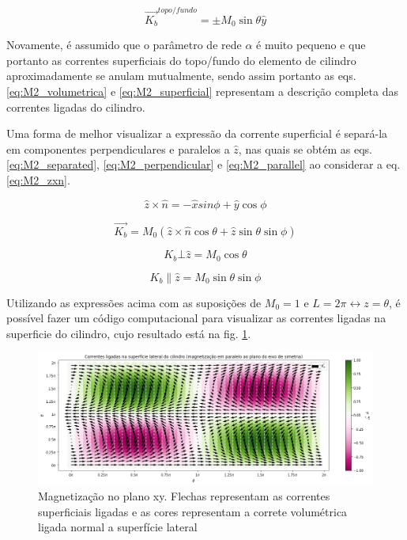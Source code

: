 \documentclass[a4paper, 12pt, twocolumn]{article}
\begin{document}
\begin{equation} \label{eq:M2_superficial_topo}
	\vec{K_b}^{topo/fundo} = \pm M_0 \sin{\theta} \hat{y}
\end{equation}

Novamente, é assumido que o parâmetro de rede $\alpha$ é muito pequeno e que portanto as correntes superficiais do topo/fundo do elemento de cilindro aproximadamente se anulam mutualmente, sendo assim portanto as eqs. \ref{eq:M2_volumetrica} e \ref{eq:M2_superficial} representam a descrição completa das correntes ligadas do cilindro.

Uma forma de melhor visualizar a expressão da corrente superficial é separá-la em componentes perpendiculares e paralelos a $\hat{z}$,  nas quais se obtém as eqs. \ref{eq:M2_separated}, \ref{eq:M2_perpendicular} e \ref{eq:M2_parallel} ao considerar a eq. \ref{eq:M2_zxn}. 

\begin{equation} \label{eq:M2_zxn}
  \hat{z} \times \hat{n} = -\hat{x} sin{\phi} + \hat{y} \cos{\phi}
\end{equation}

\begin{equation} \label{eq:M2_separated}
  \vec{K_b} = M_0 (\hat{z} \times \hat{n} \cos{\theta} + \hat{z} \sin{\theta} \sin{\phi})
\end{equation}

\begin{equation} \label{eq:M2_perpendicular}
  K_{b} \bot \hat{z} = M_0 \cos{\theta}
\end{equation}

\begin{equation} \label{eq:M2_parallel}
	K_{b} \parallel \hat{z} = M_0 \sin{\theta} \sin{\phi}
\end{equation}

Utilizando as expressões acima com as suposições de $M_0=1$ e $L=2\pi \leftrightarrow z = \theta$, é possível fazer um código computacional para visualizar as correntes ligadas na superficie do cilindro, cujo resultado está na fig. \ref{fig:helimagneto2}.

\begin{figure}
    \caption{Magnetização no plano xy. Flechas representam as correntes superficiais ligadas e as cores representam a correte volumétrica ligada normal a superfície lateral}
    \label{fig:helimagneto2}
    \centering
    \includegraphics[width=1\textwidth]{helimagneto2.png}
\end{figure}
\end{document}
